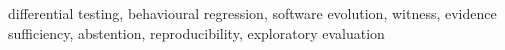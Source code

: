 differential testing, behavioural regression, software evolution, witness, evidence sufficiency, abstention, reproducibility, exploratory evaluation
